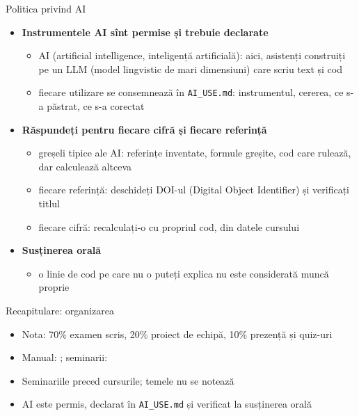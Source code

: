 \begin{frame}{Politica privind AI}
\itemsize{\small}
\begin{itemize}
    \item \textbf{Instrumentele AI sînt permise și trebuie declarate}
    \begin{itemize}
        \item AI (artificial intelligence, inteligență artificială): aici, asistenți construiți pe un LLM (model lingvistic de mari dimensiuni) care scriu text și cod
        \item fiecare utilizare se consemnează în \texttt{AI\_USE.md}: instrumentul, cererea, ce s-a păstrat, ce s-a corectat
    \end{itemize}
    \item \textbf{Răspundeți pentru fiecare cifră și fiecare referință}
    \begin{itemize}
        \item greșeli tipice ale AI: referințe inventate, formule greșite, cod care rulează, dar calculează altceva
        \item fiecare referință: deschideți DOI-ul (Digital Object Identifier) și verificați titlul
        \item fiecare cifră: recalculați-o cu propriul cod, din datele cursului
    \end{itemize}
    \item \textbf{Susținerea orală}
    \begin{itemize}
        \item o linie de cod pe care nu o puteți explica nu este considerată muncă proprie
    \end{itemize}
\end{itemize}
\end{frame}

\begin{frame}{Recapitulare: organizarea}
\itemsize{\small}
\begin{itemize}
    \item Nota: 70\% examen scris, 20\% proiect de echipă, 10\% prezență și quiz-uri
    \item Manual: ; seminarii: 
    \item Seminariile preced cursurile; temele nu se notează
    \item AI este permis, declarat în \texttt{AI\_USE.md} și verificat la susținerea orală
\end{itemize}
\end{frame}


